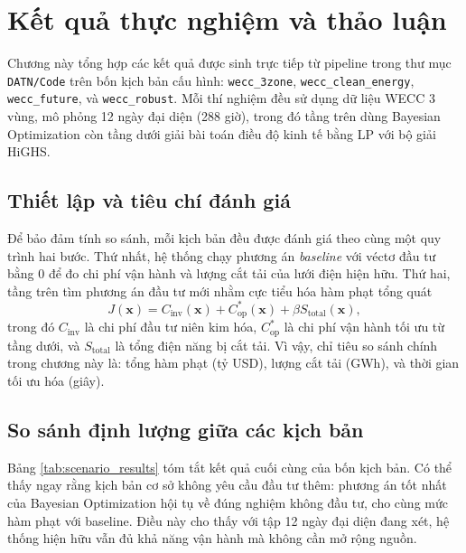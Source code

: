 \chapter{Kết quả thực nghiệm và thảo luận}
\label{chap:results}

\captionsetup[subfigure]{font=small}

Chương này tổng hợp các kết quả được sinh trực tiếp từ pipeline trong thư mục \texttt{DATN/Code} trên bốn kịch bản cấu hình: \texttt{wecc\_3zone}, \texttt{wecc\_clean\_energy}, \texttt{wecc\_future}, và \texttt{wecc\_robust}. Mỗi thí nghiệm đều sử dụng dữ liệu WECC 3 vùng, mô phỏng 12 ngày đại diện (288 giờ), trong đó tầng trên dùng Bayesian Optimization còn tầng dưới giải bài toán điều độ kinh tế bằng LP với bộ giải HiGHS.

\section{Thiết lập và tiêu chí đánh giá}

Để bảo đảm tính so sánh, mỗi kịch bản đều được đánh giá theo cùng một quy trình hai bước. Thứ nhất, hệ thống chạy phương án \textit{baseline} với véctơ đầu tư bằng 0 để đo chi phí vận hành và lượng cắt tải của lưới điện hiện hữu. Thứ hai, tầng trên tìm phương án đầu tư mới nhằm cực tiểu hóa hàm phạt tổng quát
\begin{equation}
    J(\mathbf{x}) = C_{\text{inv}}(\mathbf{x}) + C_{\text{op}}^*(\mathbf{x}) + \beta S_{\text{total}}(\mathbf{x}),
\end{equation}
trong đó $C_{\text{inv}}$ là chi phí đầu tư niên kim hóa, $C_{\text{op}}^*$ là chi phí vận hành tối ưu từ tầng dưới, và $S_{\text{total}}$ là tổng điện năng bị cắt tải. Vì vậy, chỉ tiêu so sánh chính trong chương này là: tổng hàm phạt (tỷ USD), lượng cắt tải (GWh), và thời gian tối ưu hóa (giây).

\section{So sánh định lượng giữa các kịch bản}

Bảng \ref{tab:scenario_results} tóm tắt kết quả cuối cùng của bốn kịch bản. Có thể thấy ngay rằng kịch bản cơ sở không yêu cầu đầu tư thêm: phương án tốt nhất của Bayesian Optimization hội tụ về đúng nghiệm không đầu tư, cho cùng mức hàm phạt với baseline. Điều này cho thấy với tập 12 ngày đại diện đang xét, hệ thống hiện hữu vẫn đủ khả năng vận hành mà không cần mở rộng nguồn.

